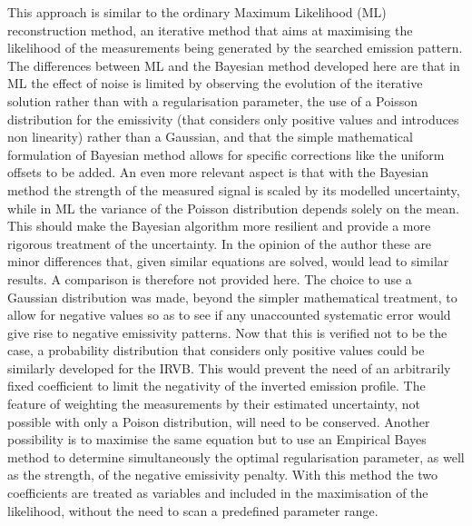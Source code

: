 This approach is similar to the ordinary Maximum Likelihood (ML) reconstruction method, an iterative method that aims at maximising the likelihood of the measurements being generated by the searched emission pattern.\cite{Craciunescu2008,Craciunescu2018} The differences between ML and the Bayesian method developed here are that in ML the effect of noise is limited by observing the evolution of the iterative solution rather than with a regularisation parameter, the use of a Poisson distribution for the emissivity (that considers only positive values and introduces non linearity) rather than a Gaussian, and that the simple mathematical formulation of Bayesian method allows for specific corrections like the uniform offsets to be added. An even more relevant aspect is that with the Bayesian method the strength of the measured signal is scaled by its modelled uncertainty, while in ML the variance of the Poisson distribution depends solely on the mean. This should make the Bayesian algorithm more resilient and provide a more rigorous treatment of the uncertainty. In the opinion of the author these are minor differences that, given similar equations  are solved, would lead to similar results. A comparison is therefore not provided here. The choice to use a Gaussian distribution was made, beyond the simpler mathematical treatment, to allow for negative values so as to see if any unaccounted systematic error would give rise to negative emissivity patterns. Now that this is verified not to be the case, a probability distribution that considers only positive values could be similarly developed for the IRVB. This would prevent the need of an arbitrarily fixed coefficient to limit the negativity of the inverted emission profile. The feature of weighting the measurements by their estimated uncertainty, not possible with only a Poison distribution, will need to be conserved. 
Another possibility is to maximise the same equation but to use an Empirical Bayes method to determine simultaneously the optimal regularisation parameter, as well as the strength, of the negative emissivity penalty. With this method the two coefficients are treated as variables and included in the maximisation of the likelihood, without the need to scan a predefined parameter range.\cite{Carlin2000}

